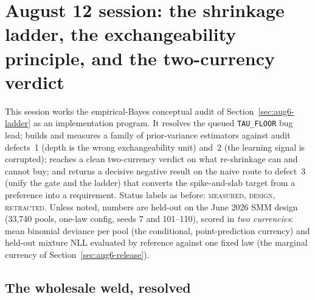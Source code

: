 \section{August 12 session: the shrinkage ladder, the exchangeability principle, and the two-currency verdict}\label{sec:aug12}

This session works the empirical-Bayes conceptual audit of
Section~\ref{sec:aug6-ladder} as an implementation program. It resolves the
queued \texttt{TAU\_FLOOR} bug lead; builds and measures a family of
prior-variance estimators against audit defects~1 (depth is the wrong
exchangeability unit) and~2 (the learning signal is corrupted); reaches a
clean two-currency verdict on what re-shrinkage can and cannot buy; and
returns a decisive negative result on the naive route to defect~3 (unify the
gate and the ladder) that converts the spike-and-slab target from a
preference into a requirement. Status labels as before: \textsc{measured},
\textsc{design}, \textsc{retracted}. Unless noted, numbers are held-out on the
June 2026 SMM design (33{,}740 pools, one-law config, seeds 7 and 101--110),
scored in \emph{two currencies}: mean binomial deviance per pool (the
conditional, point-prediction currency) and held-out mixture NLL evaluated by
reference against one fixed law (the marginal currency of
Section~\ref{sec:aug6-release}).

\subsection{The wholesale weld, resolved}\label{sec:aug12-floor}

